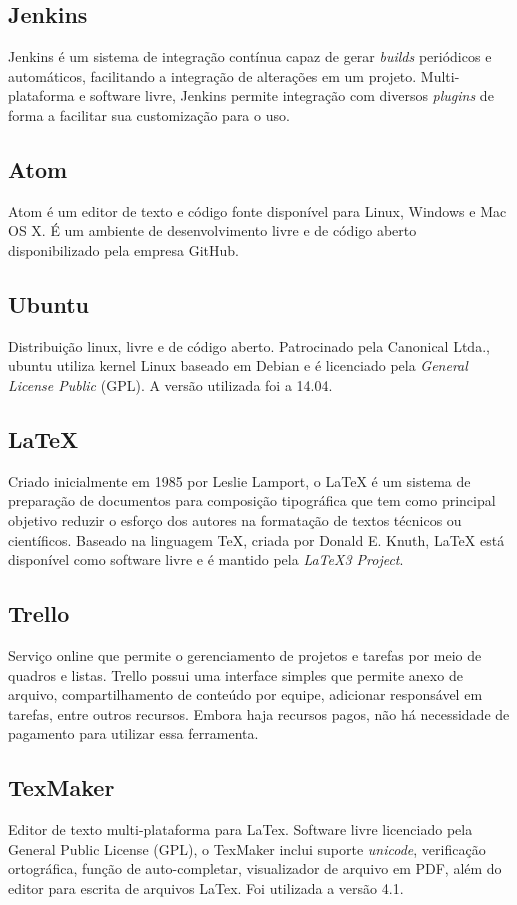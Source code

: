 \subsection{Jenkins}
Jenkins é um sistema de integração contínua capaz de gerar \textit{builds} periódicos e automáticos, facilitando a integração de alterações em um projeto. Multi-plataforma e software livre, Jenkins permite integração com diversos \textit{plugins} de forma a facilitar sua customização para o uso.

\subsection{Atom}
Atom é um editor de texto e código fonte disponível para Linux, Windows e Mac OS X. É um ambiente de desenvolvimento livre e de código aberto disponibilizado pela empresa GitHub. 

\subsection{Ubuntu}
Distribuição linux, livre e de código aberto. Patrocinado pela Canonical Ltda., ubuntu utiliza kernel Linux baseado em Debian e é licenciado pela \textit{General License Public} (GPL). A versão utilizada foi a 14.04.  

\subsection{LaTeX}
Criado inicialmente em 1985 por Leslie Lamport, o LaTeX é um sistema de preparação de documentos para composição tipográfica que tem como principal objetivo reduzir o esforço dos autores na formatação de textos técnicos ou científicos. Baseado na linguagem TeX, criada por Donald E. Knuth, LaTeX está disponível como software livre e é mantido pela \textit{LaTeX3 Project}.

\subsection{Trello} 
Serviço online que permite o gerenciamento de projetos e tarefas por meio de quadros e listas. Trello possui uma interface simples que permite anexo de arquivo, compartilhamento de conteúdo por equipe, adicionar responsável em tarefas,  entre outros recursos. Embora haja recursos pagos, não há necessidade de pagamento para utilizar essa ferramenta.

\subsection{TexMaker}
Editor de texto multi-plataforma para LaTex. Software livre licenciado pela General Public License (GPL), o TexMaker inclui suporte \textit{unicode}, verificação ortográfica, função de auto-completar, visualizador de arquivo em PDF, além do editor para escrita de arquivos LaTex. Foi utilizada a versão 4.1.

